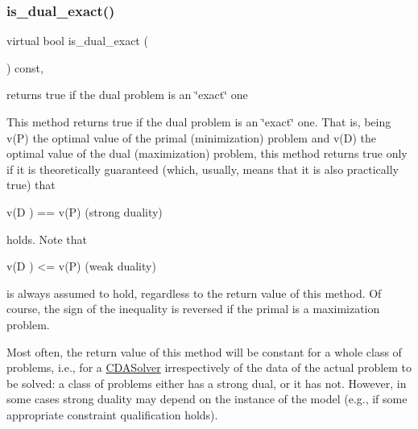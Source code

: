 \mbox{\label{class_s_m_spp__di__unipi__it_1_1_c_d_a_solver_a402db4cab5024abd480ae2186cf467cc}} 
\subsubsection{\texorpdfstring{is\+\_\+dual\+\_\+exact()}{is\_dual\_exact()}}
{\footnotesize\ttfamily virtual bool is\+\_\+dual\+\_\+exact (\begin{DoxyParamCaption}\item[{void}]{ }\end{DoxyParamCaption}) const\hspace{0.3cm}{\ttfamily [inline]}, {\ttfamily [virtual]}}



returns true if the dual problem is an \char`\"{}exact\char`\"{} one 

This method returns true if the dual problem is an \char`\"{}exact\char`\"{} one. That is, being v(\+P) the optimal value of the primal (minimization) problem and v(\+D) the optimal value of the dual (maximization) problem, this method returns true only if it is theoretically guaranteed (which, usually, means that it is also practically true) that \begin{DoxyVerb}  v(D ) == v(P)      (strong duality)
\end{DoxyVerb}


holds. Note that \begin{DoxyVerb}  v(D ) <= v(P)      (weak duality)
\end{DoxyVerb}


is always assumed to hold, regardless to the return value of this method. Of course, the sign of the inequality is reversed if the primal is a maximization problem.

Most often, the return value of this method will be constant for a whole class of problems, i.\+e., for a \mbox{\hyperlink{class_s_m_spp__di__unipi__it_1_1_c_d_a_solver}{C\+D\+A\+Solver}} irrespectively of the data of the actual problem to be solved\+: a class of problems either has a strong dual, or it has not. However, in some cases strong duality may depend on the instance of the model (e.\+g., if some appropriate constraint qualification holds).

